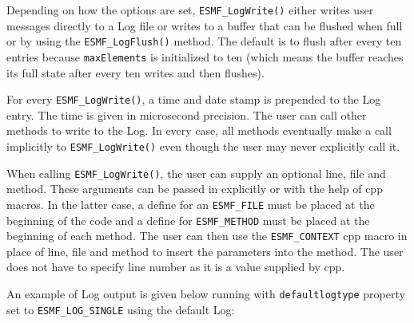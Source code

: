 Depending on how the options are set, {\tt ESMF\_LogWrite()} either writes user
messages directly to a Log file or writes to a buffer that can be flushed when 
full or by using the {\tt ESMF\_LogFlush()} method.  The default is to flush 
after every ten entries because {\tt maxElements} is initialized to ten 
(which means the buffer reaches its full state after every ten writes and then
flushes).

For every {\tt ESMF\_LogWrite()}, a time and date stamp is prepended to the
Log entry.  The time is given in microsecond precision.  The user can call 
other methods to write to the Log.  In every case, all methods eventually make 
a call implicitly to {\tt ESMF\_LogWrite()} even though the user may never 
explicitly call it.

When calling {\tt ESMF\_LogWrite()}, the user can supply an optional line,
file and method.  These arguments can be passed in explicitly or with the help
of cpp macros.  In the latter case, a define for an {\tt ESMF\_FILE} must be 
placed at the beginning of the code and a define for {\tt ESMF\_METHOD} must
be placed at the beginning of each method.  The user can then use the
{\tt ESMF\_CONTEXT} cpp macro in place of line, file and method to insert the 
parameters into the method.  The user does not have to specify line number as
it is a value supplied by cpp.

An example of Log output is given below running with {\tt defaultlogtype} 
property set to {\tt ESMF\_LOG\_SINGLE} using the default Log:

